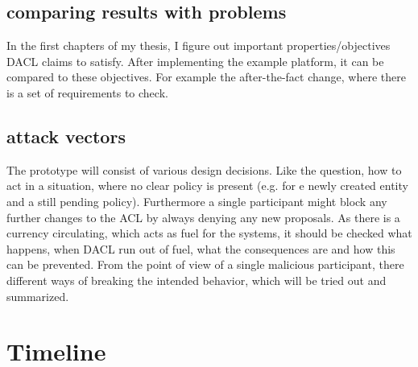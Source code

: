 \documentclass[12pt, conference]{IEEEtran}
\begin{document}
\subsection{comparing results with problems}

In the first chapters of my thesis, I figure out important properties/objectives DACL claims to satisfy. After implementing the example platform, it can be compared to these objectives. For example the after-the-fact change, where there is a set of requirements to check.

\subsection{attack vectors}

The prototype will consist of various design decisions. Like the question, how to act in a situation, where no clear policy is present (e.g. for e newly created entity and a still pending policy). Furthermore a single participant might block any further changes to the ACL by always denying any new proposals. As there is a currency circulating, which acts as fuel for the systems, it should be checked what happens, when DACL run out of fuel, what the consequences are and how this can be prevented. From the point of view of a single malicious participant, there different ways of breaking the intended behavior, which will be tried out and summarized.

%
%

\newpage

\section{Timeline}
\end{document}
